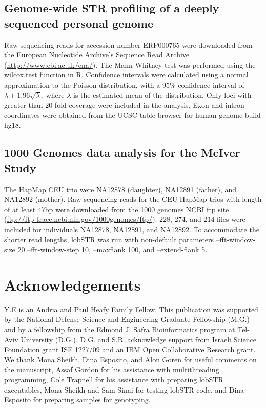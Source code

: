 {\subsection{Genome-wide STR profiling of a deeply sequenced personal genome}
Raw sequencing reads for accession number ERP000765 were downloaded from the European Nucleotide Archive's Sequence Read Archive (\url{http://www.ebi.ac.uk/ena/}). The Mann-Whitney test was performed using the wilcox.test function in R. Confidence intervals were calculated using a normal approximation to the Poisson distribution, with a 95\% confidence interval of $\lambda\pm 1.96\sqrt{\lambda}$, where $\lambda$ is the estimated mean of the distribution. Only loci with greater than 20-fold coverage were included in the analysis. Exon and intron coordinates were obtained from the UCSC table browser for human genome build hg18. 

\subsection{1000 Genomes data analysis for the McIver Study}
The HapMap CEU trio were NA12878 (daughter), NA12891 (father), and NA12892 (mother). Raw sequencing reads for the CEU HapMap trios with length of at least 47bp were downloaded from the 1000 genomes NCBI ftp site (\url{ftp://ftp-trace.ncbi.nih.gov/1000genomes/ftp/}). 228, 274, and 214 files were included for individuals NA12878, NA12891, and NA12892. To accommodate the shorter read lengths, lobSTR was run with non-default parameters –fft-window-size 20 –fft-window-step 10, --maxflank 100, and –extend-flank 5. 

\section{Acknowledgements}
Y.E is an Andria and Paul Heafy Family Fellow. This publication was supported by the National Defense Science and Engineering Graduate Fellowship (M.G.) and by a fellowship from the Edmond J. Safra Bioinformatics program at Tel-Aviv University (D.G.). D.G. and S.R. acknowledge support from Israeli Science Foundation grant ISF 1227/09 and an IBM Open Collaborative Research grant. We thank Mona Sheikh, Dina Esposito, and Alon Goren for useful comments on the manuscript, Assaf Gordon for his assistance with multithreading programming, Cole Trapnell for his assistance with preparing lobSTR executables, Mona Sheikh and Sam Sinai for testing lobSTR code, and Dina Esposito for preparing samples for genotyping. 

}
